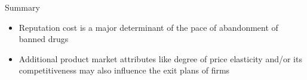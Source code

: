 \documentclass[aspectratio=43]{beamer}
\begin{document}
%

\begin{frame}{Summary}
	\begin{itemize}
		\item Reputation cost is a major determinant of the pace of abandonment of banned drugs
		\pause
		\medskip
		\item Additional product market attributes like degree of price elasticity and/or its competitiveness may also influence the exit plans of firms
	\end{itemize}
\end{frame}
\end{document}
